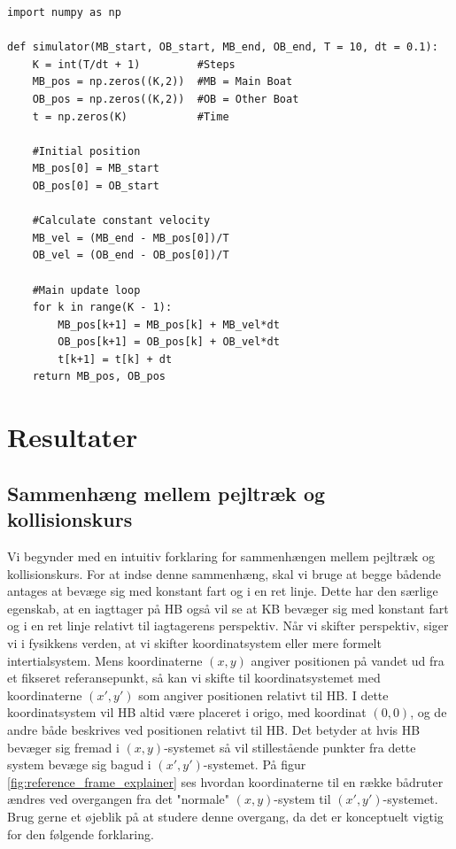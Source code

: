\documentclass[%
 reprint,
nofootinbib,
aps,
]{revtex4-1}
\begin{document}
\begin{verbatim}
import numpy as np

def simulator(MB_start, OB_start, MB_end, OB_end, T = 10, dt = 0.1):
    K = int(T/dt + 1)         #Steps
    MB_pos = np.zeros((K,2))  #MB = Main Boat
    OB_pos = np.zeros((K,2))  #OB = Other Boat
    t = np.zeros(K)           #Time

    #Initial position
    MB_pos[0] = MB_start
    OB_pos[0] = OB_start

    #Calculate constant velocity
    MB_vel = (MB_end - MB_pos[0])/T
    OB_vel = (OB_end - OB_pos[0])/T

    #Main update loop
    for k in range(K - 1):
        MB_pos[k+1] = MB_pos[k] + MB_vel*dt
        OB_pos[k+1] = OB_pos[k] + OB_vel*dt
        t[k+1] = t[k] + dt
    return MB_pos, OB_pos
\end{verbatim}


\section{Resultater}
\subsection{Sammenhæng mellem pejltræk og kollisionskurs}
Vi begynder med en intuitiv forklaring for sammenhængen mellem pejltræk og kollisionskurs. For at indse denne sammenhæng, skal vi bruge at begge bådende antages at bevæge sig med konstant fart og i en ret linje. Dette har den særlige egenskab, at en iagttager på HB også vil se at KB bevæger sig med konstant fart og i en ret linje relativt til iagtagerens perspektiv. Når vi skifter perspektiv, siger vi i fysikkens verden, at vi skifter koordinatsystem eller mere formelt intertialsystem. Mens koordinaterne $(x, y)$ angiver positionen på vandet ud fra et fikseret referansepunkt, så kan vi skifte til koordinatsystemet med koordinaterne $(x',y')$ som angiver positionen relativt til HB. I dette koordinatsystem vil HB altid være placeret i origo, med koordinat $(0,0)$, og de andre både beskrives ved positionen relativt til HB. Det betyder at hvis HB bevæger sig fremad i $(x,y)$-systemet så vil stillestående punkter fra dette system bevæge sig bagud i $(x',y')$-systemet. På figur \ref{fig:reference_frame_explainer} ses hvordan koordinaterne til en række bådruter ændres ved overgangen fra det "normale" $(x,y)$-system til $(x',y')$-systemet. Brug gerne et øjeblik på at studere denne overgang, da det er konceptuelt vigtig for den følgende forklaring.
\end{document}
